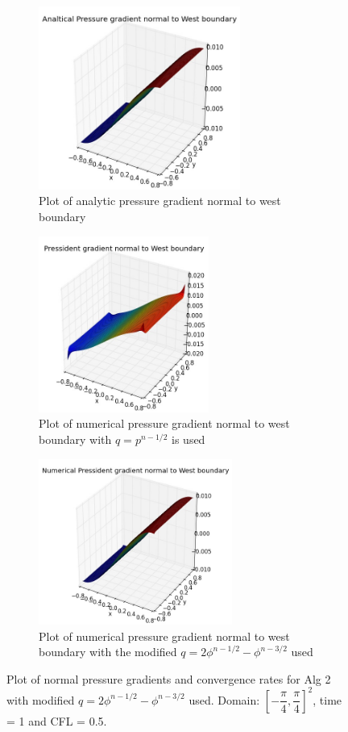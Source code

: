 \begin{figure}[H]
	\centering
	\begin{subfigure}[t]{2.6in}
		\centering
		\includegraphics[width=2.6in]{figures/Pm1b2_unf1_np_W_NPexgrad_t_1_grid_60.jpg}
		\caption{Plot of analytic pressure gradient normal to west boundary}\label{fig:6.19a}		
	\end{subfigure}
	\quad
	\begin{subfigure}[t]{2.2in}
		\centering
		\includegraphics[width=2.2in]{figures/Pm1b_unf1_np_W_Npf_t_1_grid_60.jpg}
		\caption{Plot of numerical pressure gradient normal to west boundary with $q = p^{n-1/2}$ is used}\label{fig:6.19b}
	\end{subfigure}
	\quad
	\centering
	\begin{subfigure}[t]{2.5in}
		\centering
		\includegraphics[width=2.5in]{figures/Pm1b2_unf1_np_W_Npf_t_1_grid_60.jpg}
		\caption{Plot of numerical pressure gradient normal to west boundary with the modified $q = 2\phi^{n-1/2} - \phi^{n-3/2}$ used}\label{fig:6.19a}		
	\end{subfigure}
	\caption{Plot of normal pressure gradients and convergence rates for Alg 2 with modified $q = 2\phi^{n-1/2} - \phi^{n-3/2}$ used. Domain: $[-\dfrac{\pi}{4}, \dfrac{\pi}{4}]^2$, time = 1 and CFL = 0.5.}\label{fig:6.16}
\end{figure}


